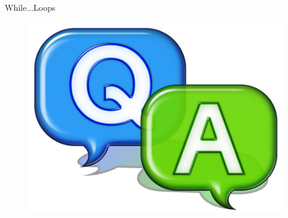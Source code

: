 \documentclass[14pt]{beamer}
\begin{document}
\begin{frame}{While...Loops}
 \begin{figure}[H]
 \begin{center}
   \includegraphics[scale=.3]{qa.png}   
 \end{center}
  \end{figure}
\end{frame}
\end{document}
